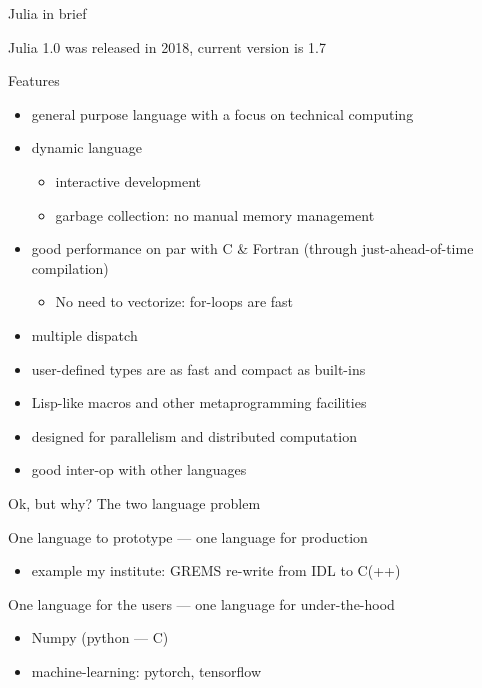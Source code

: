 \documentclass[compress,presentation,aspectratio=169]{beamer}
\begin{document}
\begin{frame}[label={sec:orgf4971a5}]{Julia in brief}
      \footnotesize
\begin{block}{Julia 1.0 was released in 2018, current version is 1.7}
\end{block}

\begin{block}{Features}
\begin{itemize}
\item general purpose language with a focus on technical computing
\item dynamic language
\begin{itemize}
\item interactive development
\item garbage collection: no manual memory management
\end{itemize}
\item good performance on par with C \& Fortran (through just-ahead-of-time compilation)
\begin{itemize}
\item No need to vectorize: for-loops are fast
\end{itemize}
\item multiple dispatch
\item user-defined types are as fast and compact as built-ins
\item Lisp-like macros and other metaprogramming facilities
\item designed for parallelism and distributed computation
\item good inter-op with other languages
\end{itemize}
\end{block}
\end{frame}

\begin{frame}[label={sec:org28a3717}]{Ok, but why?}
  \footnotesize
\alert{The two language problem}

\begin{block}{One language to prototype   ---  one language for production}
\begin{itemize}
\item example my institute: GREMS re-write from IDL to C(++)
\end{itemize}
\end{block}

\begin{block}{One language for the users  ---  one language for under-the-hood}
\begin{itemize}
\item Numpy (python --- C)
\item machine-learning: pytorch, tensorflow
\end{itemize}
\end{block}
\end{frame}
\end{document}

